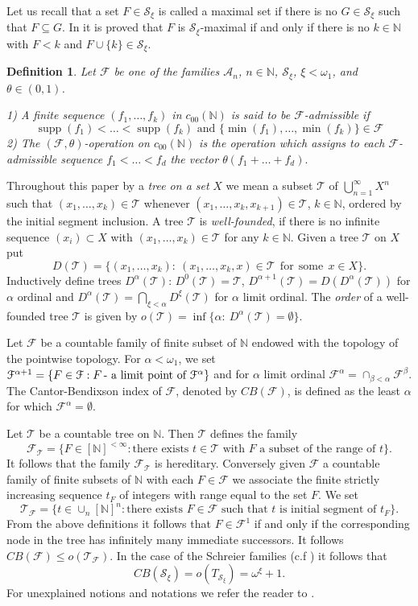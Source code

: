 \documentclass[a4paper]{amsart}
\theoremstyle{plain}
\newtheorem{definition}[theorem]{Definition}
\newcommand{\N}{\mathbb{N}}
\newcommand{\mc}{\mathcal}
\newcommand{\al}{\alpha}
\DeclareMathOperator{\supp}{supp}
\begin{document}
Let us recall that a set $F\in \mc{S}_\xi$ is called a maximal set if  there is no $G\in
\mc{S}_\xi$ such that $F\subseteq G$.  In \cite{GA} it is proved that $F$ is
$\mathcal{S}_{\xi}$-maximal if and only if there is no $k\in\N$ with $F<k$ and
$F\cup\{k\}\in\mc{S}_{\xi}$.
\begin{definition} Let $\mc{F}$ be one of the families  $\mc{A}_n$, $n\in\N$, $\mc{S}_{\xi}$, $\xi<\omega_{1}$, and $\theta\in (0,1)$.

1) A finite sequence $(f_{1},\dots, f_{k})$ in $c_{00}(\N)$ is said to be $\mc{F}$-admissible if
$$
\mbox{$\supp(f_1)<\dots<\supp(f_k)$ and $\{\min (f_{1}),\dots,\min (f_{k})\}\in\mc{F}$}
$$
2) The $(\mc{F},\theta)$-operation on $c_{00}(\N)$ is the operation which assigns to each $\mc{F}$-admissible sequence $f_{1}<\dots<f_{d}$ the vector $\theta(f_{1}+\dots+f_{d}).$
\end{definition}
Throughout this paper by a \textit{tree on a set} $X$ we mean a subset $\mc{T}$ of
$\bigcup_{n=1}^\infty X^n$ such that $(x_1,\dots,x_k)\in \mc{T}$ whenever
$(x_1,\dots,x_k,x_{k+1})\in \mc{T}$, $k\in\N$, ordered by the initial segment inclusion.
A tree $ \mc{T}$ is \textit{well-founded}, if there is no infinite sequence $(x_i)\subset
X$ with $(x_1,\dots,x_k)\in \mc{T}$ for any $k\in\N$. Given a tree $ \mc{T}$ on $X$ put
$$
D( \mc{T})=\{(x_1,\dots,x_k):\ (x_1,\dots,x_k,x)\in \mc{T} \ \ \mathrm{for}\ \ \mathrm{some}\ \ x\in X\}.
$$
Inductively define trees $D^\al( \mc{T})$: $D^0( \mc{T})= \mc{T}$,
$D^{\al+1}(\mc{T})=D(D^\al( \mc{T}))$ for $\al$ ordinal and $D^\al(
\mc{T})=\bigcap_{\xi<\al}D^\xi( \mc{T})$ for $\al$ limit ordinal. The
\textit{order} of a well-founded tree $ \mc{T}$ is given by $o(
\mc{T})=\inf\{\al:\ D^\al( \mc{T})=\emptyset \}$.

Let $\mc{F}$ be a countable family  of  finite subset of $\N$
endowed with the topology of the pointwise topology.  For
$\al<\omega_{1}$, we set $\mc{F}^{\al+1}=\{F\in \mc{F}: F
\mbox{\,- a limit point of } \mc{F}^{\al}\}$ and for $\al$ limit
ordinal $\mc{F}^{\al}=\cap_{\beta<\al}\mc{F}^{\beta}$. The
Cantor-Bendixson index of $\mc{F}$, denoted by $CB(\mc{F})$, is
defined as the least $\al$ for which $\mc{F}^{\al}=\emptyset$.

Let $\mc{\mc{T}}$ be a countable tree on $\N$. Then $\mc{T}$
defines the family
$$
\mc{F}_{\mc{T}}=\{F\in [\N]^{<\infty}: \text{there exists $t\in
\mc{T}$ with  $F$ a subset of the range of $t$}\}.
$$
It follows that the family $\mc{F}_{\mc{T}}$ is hereditary. Conversely given $\mc{F}$ a countable family of finite subsets of $\N$ with  each
$F\in\mc{F}$ we associate  the finite strictly increasing sequence $t_{F}$ of integers
with range equal to the set $F$. We set
$$\mc{T}_{\mc{F}}=\{t\in \cup_{n} [\N]^{n}: \mbox{there exists $F\in\mc{F}$ such that $t$ is initial segment of $t_{F}$}\}.
$$
From the above definitions it follows that $F\in \mc{F}^{1}$ if and only if the
corresponding node in the tree has infinitely many immediate successors. It follows
$CB(\mc{F}) \leq o(\mc{T_{F}})$. In the case of the Schreier families  (c.f \cite{AA}) it
follows that
$$
CB(\mc{S}_{\xi})=o(T_{\mc{S}_{\xi}})=\omega^{\xi}+1.
$$
For  unexplained notions and notations we refer the reader to
\cite{LT}.
\end{document}
